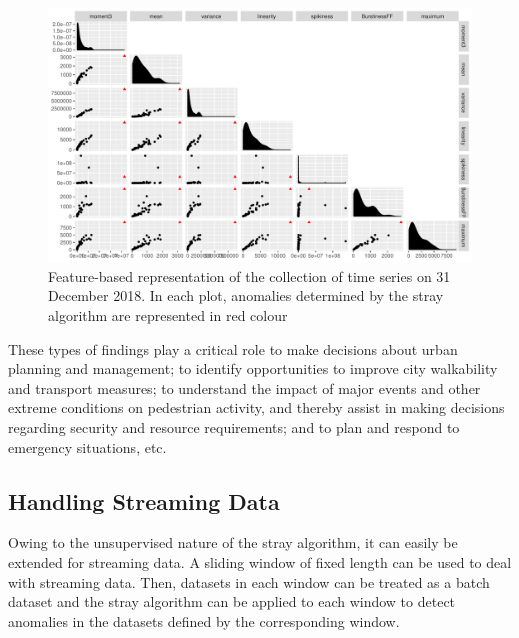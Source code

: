 \documentclass[11pt,a4paper,]{article}
\theoremstyle{definition}
\theoremstyle{definition}
\theoremstyle{definition}
\theoremstyle{remark}
\begin{document}
\begin{figure}[h]

{\centering \includegraphics[width=1\linewidth]{figure/Dec31AnomSensorsFeatures-1} 

}

\caption{Feature-based representation of the collection of  time series on 31 December 2018. In each plot, anomalies determined by the stray algorithm are represented in red colour}\label{fig:Dec31AnomSensorsFeatures}
\end{figure}

These types of findings play a critical role to make decisions about urban planning and management; to identify opportunities to improve city walkability and transport measures; to understand the impact of major events and other extreme conditions on pedestrian activity, and thereby assist in making decisions regarding security and resource requirements; and to plan and respond to emergency situations, etc.

\hypertarget{handling-streaming-data}{%
\subsection{Handling Streaming Data}\label{handling-streaming-data}}

Owing to the unsupervised nature of the stray algorithm, it can easily be extended for streaming data. A sliding window of fixed length can be used to deal with streaming data. Then, datasets in each window can be treated as a batch dataset \autocite{talagala2019feature} and the stray algorithm can be applied to each window to detect anomalies in the datasets defined by the corresponding window.
\end{document}
